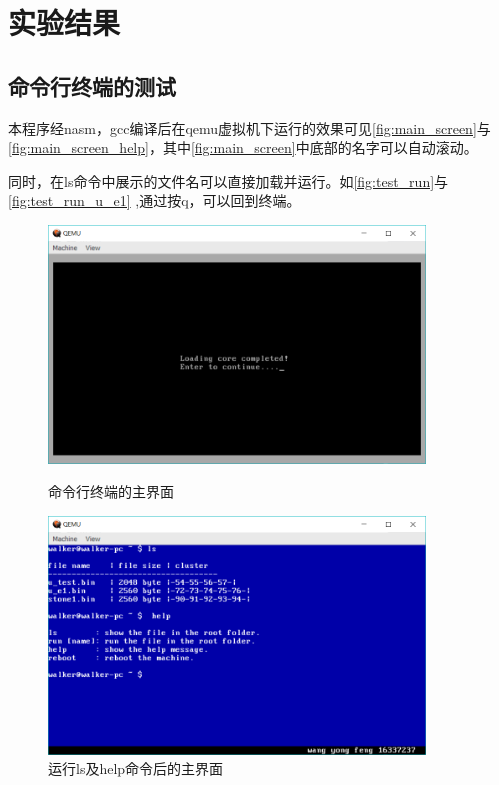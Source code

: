 \documentclass[forprint]{WHUBachelor}
\begin{document}
\chapter{实验结果}

\section{命令行终端的测试}

本程序经nasm，gcc编译后在qemu虚拟机下运行的效果可见\autoref{fig:main_screen}与\autoref{fig:main_screen_help}，其中\autoref{fig:main_screen}中底部的名字可以自动滚动。

同时，在ls命令中展示的文件名可以直接加载并运行。如\autoref{fig:test_run}与\autoref{fig:test_run_u_e1}
,通过按q，可以回到终端。
\begin{figure}[htp]
  \centering
  \begin{minipage}[t]{0.5\linewidth} 
    \centering
  \includegraphics[width=10cm]{"./figure/main_screen.png"}
  \caption{命令行终端的主界面}
  \label{fig:main_screen}
\end{minipage}

  \begin{minipage}[t]{0.5\linewidth} 
  \centering
  \includegraphics[width=10cm]{"./figure/main_screen_help.png"}
  \caption{运行ls及help命令后的主界面}
  \label{fig:main_screen_help}
\end{minipage}
\end{figure}
\end{document}
